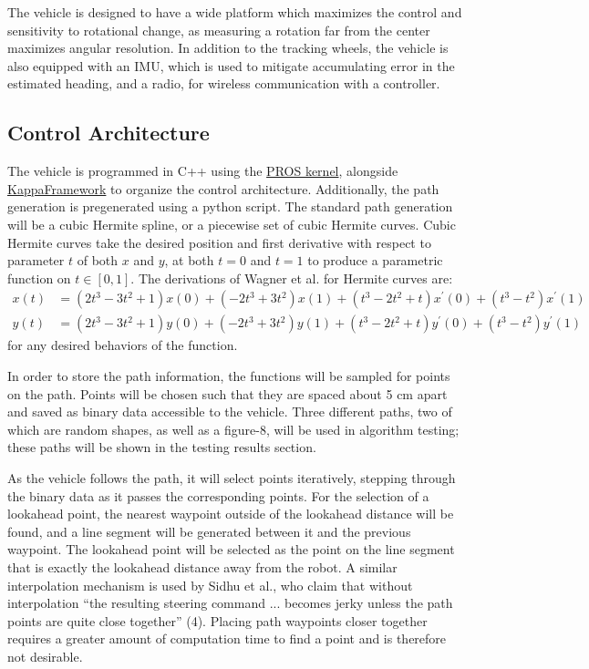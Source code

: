 \documentclass[mla7]{mla}
\begin{document}
\begin{paper}
The vehicle is designed to have a wide platform which maximizes the control and sensitivity to rotational change, as measuring a rotation far from the center maximizes angular resolution. In addition to the tracking wheels, the vehicle is also equipped with an IMU, which is used to mitigate accumulating error in the estimated heading, and a radio, for wireless communication with a controller.

\subsection{Control Architecture}

The vehicle is programmed in C++ using the \href{https://github.com/purduesigbots/pros}{PROS kernel}, alongside \href{https://github.com/SpencerJ21/KappaFramework}{KappaFramework} to organize the control architecture. Additionally, the path generation is pregenerated using a python script. The standard path generation will be a cubic Hermite spline, or a piecewise set of cubic Hermite curves. Cubic Hermite curves take the desired position and first derivative with respect to parameter $t$ of both $x$ and $y$, at both $t=0$ and $t=1$ to produce a parametric function on $t\in[0,1]$. The derivations of Wagner et al. for Hermite curves are:
\begin{subequations}
\begin{align}
x(t)&=(2t^3-3t^2+1)x(0)+(-2t^3+3t^2)x(1)+(t^3-2t^2+t)x^\prime(0)+(t^3-t^2)x^\prime(1) \\
y(t)&=(2t^3-3t^2+1)y(0)+(-2t^3+3t^2)y(1)+(t^3-2t^2+t)y^\prime(0)+(t^3-t^2)y^\prime(1)
\end{align}
\end{subequations}
for any desired behaviors of the function.

In order to store the path information, the functions will be sampled for points on the path. Points will be chosen such that they are spaced about 5 cm apart and saved as binary data accessible to the vehicle. Three different paths, two of which are random shapes, as well as a figure-8, will be used in algorithm testing; these paths will be shown in the testing results section.

As the vehicle follows the path, it will select points iteratively, stepping through the binary data as it passes the corresponding points. For the selection of a lookahead point, the nearest waypoint outside of the lookahead distance will be found, and a line segment will be generated between it and the previous waypoint. The lookahead point will be selected as the point on the line segment that is exactly the lookahead distance away from the robot. A similar interpolation mechanism is used by Sidhu et al., who claim that without interpolation ``the resulting steering command ... becomes jerky unless the path points are quite close together'' (4). Placing path waypoints closer together requires a greater amount of computation time to find a point and is therefore not desirable. 


\end{paper}
\end{document}
